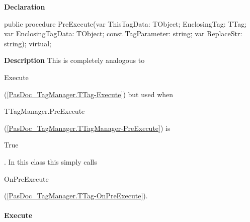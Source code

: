 \documentclass{report}
\newif\ifpdf
\begin{document}
\label{PasDoc_TagManager.TTag-PreExecute}
\begin{list}{}{
\setlength{\itemindent}{0cm}
\setlength{\listparindent}{0cm}
\setlength{\leftmargin}{\evensidemargin}
\addtolength{\leftmargin}{\tmplength}
\settowidth{\labelsep}{X}
\addtolength{\leftmargin}{\labelsep}
\setlength{\labelwidth}{\tmplength}
}
\item[\textbf{Declaration}\hfill]
\ifpdf
\begin{flushleft}
\fi
\begin{ttfamily}
public procedure PreExecute(var ThisTagData: TObject; EnclosingTag: TTag; var EnclosingTagData: TObject; const TagParameter: string; var ReplaceStr: string); virtual;\end{ttfamily}

\ifpdf
\end{flushleft}
\fi

\par
\item[\textbf{Description}]
This is completely analogous to \begin{ttfamily}Execute\end{ttfamily}(\ref{PasDoc_TagManager.TTag-Execute}) but used when \begin{ttfamily}TTagManager.PreExecute\end{ttfamily}(\ref{PasDoc_TagManager.TTagManager-PreExecute}) is \begin{ttfamily}True\end{ttfamily}. In this class this simply calls \begin{ttfamily}OnPreExecute\end{ttfamily}(\ref{PasDoc_TagManager.TTag-OnPreExecute}).

\end{list}
\paragraph*{Execute}\hspace*{\fill}
\end{document}
